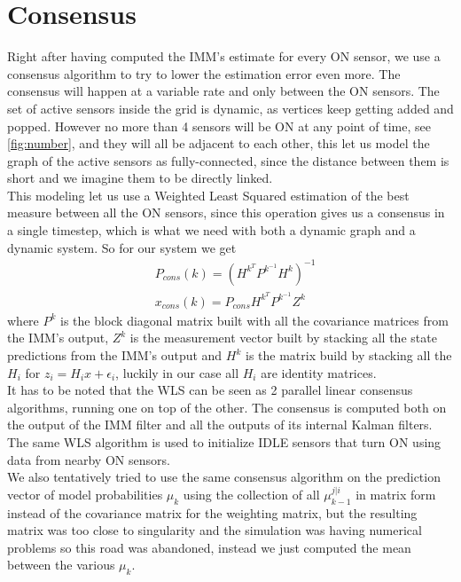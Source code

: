 \documentclass[twocolumn]{article}
\begin{document}
\section*{Consensus}
Right after having computed the IMM's estimate for every ON sensor, we use a consensus algorithm to try to lower the
estimation error even more. The consensus will happen at a variable rate and only between the ON sensors.
The set of active sensors inside the grid is dynamic, as vertices keep getting added and popped. However no
more than 4 sensors will be ON at any point of time, see \ref{fig:number}, and they will all be adjacent to each other,
this let us model the graph of the active sensors as fully-connected, since the distance between them is short
and we imagine them to be directly linked.
\\
This modeling let us use a Weighted Least Squared estimation of the best measure between all the ON sensors, since this operation
gives us a consensus in a single timestep, which is what we need with both a dynamic graph and a dynamic system.
So for our system we get
\begin{align*}
     & P_{cons}(k)=(H^{k^{T}}P^{k^{-1}}H^{k})^{-1}  \\
     & x_{cons}(k)=P_{cons}H^{k^{T}}P^{k^{-1}}Z^{k}
\end{align*}
where $P^{k}$ is the block diagonal matrix built with all the covariance matrices from the IMM's output, $Z^{k}$
is the measurement vector built by stacking all the state predictions from the IMM's output and $H^{k}$ is the matrix build by
stacking all the $H_{i}$ for $z_{i}=H_{i}x+\epsilon_{i}$, luckily in our case all $H_{i}$ are identity matrices.\\
It has to be noted that the WLS can be seen as 2 parallel linear consensus algorithms, running one on top of the other.
The consensus is computed both on the output of the IMM filter and all the outputs of its internal Kalman filters. 
The same WLS algorithm is used to initialize IDLE sensors that turn ON using data from nearby ON sensors.
\\
We also tentatively tried to use the same consensus algorithm on the prediction vector of model probabilities $\mu_{k}$ using
the collection of all $\mu^{j|i}_{k-1}$ in matrix form instead of the covariance matrix for the weighting matrix, but
the resulting matrix was too close to singularity and the simulation was having numerical problems so this road
was abandoned, instead we just computed the mean between the various $\mu_{k}$.
\end{document}

